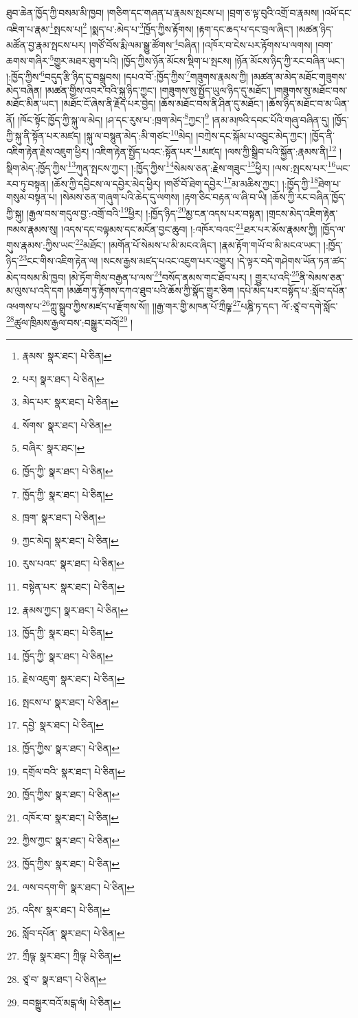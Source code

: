 ཐུབ་ཆེན་ཁྱོད་ཀྱི་བསམ་མི་ཁྱབ། །གཅིག་དང་གཞན་པ་རྣམས་སྤངས་པ། །བྲག་ཅ་ལྟ་བུའི་འགྲོ་བ་རྣམས། །འཕོ་དང་འཇིག་པ་རྣམ་\footnote{རྣམས་  སྣར་ཐང་།  པེ་ཅིན། }སྤངས་པ།\footnote{པར།  སྣར་ཐང་།  པེ་ཅིན། } །སྨད་པ་:མེད་པ་\footnote{མེད་པར་  སྣར་ཐང་།  པེ་ཅིན། }ཁྱོད་ཀྱིས་རྟོགས། །རྟག་དང་ཆད་པ་དང་བྲལ་ཞིང་། །མཚན་ཉིད་མཚོན་བྱ་རྣམ་སྤངས་པར། །གཙོ་བོས་རྨི་ལམ་སྒྱུ་ཚོགས་\footnote{སོགས་  སྣར་ཐང་།  པེ་ཅིན། }བཞིན། །འཁོར་བ་ངེས་པར་རྟོགས་པ་ལགས། །བག་ཆགས་གཞིར་\footnote{བཞིར་  སྣར་ཐང་། }གྱུར་མཐར་ཐུག་པའི། །ཁྱོད་ཀྱིས་ཉོན་མོངས་སྡིག་པ་སྤངས། །ཉོན་མོངས་ཉིད་ཀྱི་རང་བཞིན་ཡང་། །:ཁྱོད་ཀྱིས་\footnote{ཁྱོད་ཀྱི་  སྣར་ཐང་།  པེ་ཅིན། }བདུད་རྩི་ཉིད་དུ་བསྒྲུབས། །དཔའ་བོ་:ཁྱོད་ཀྱིས་\footnote{ཁྱོད་ཀྱི་  སྣར་ཐང་།  པེ་ཅིན། }གཟུགས་རྣམས་ཀྱི། །མཚན་མ་མེད་མཐོང་གཟུགས་མེད་བཞིན། །མཚན་གྱིས་འབར་བའི་སྐུ་ཉིད་ཀྱང་། །གཟུགས་སུ་སྤྱོད་ཡུལ་ཉིད་དུ་མཐོང་། །གཟུགས་སུ་མཐོང་བས་མཐོང་མིན་ཡང་། །མཐོང་ངོ་ཞེས་ནི་རྗོད་པར་བྱེད། །ཆོས་མཐོང་བས་ནི་ཤིན་དུ་མཐོང་། །ཆོས་ཉིད་མཐོང་བ་མ་ཡིན་ནོ། །ཁོང་སྟོང་ཁྱོད་ཀྱི་སྐུ་ལ་མེད། །ཤ་དང་རུས་པ་:ཁྲག་མེད་\footnote{ཁྲག་  སྣར་ཐང་།  པེ་ཅིན། }ཀྱང་།\footnote{ཀྱང་མེད།  སྣར་ཐང་།  པེ་ཅིན། } །ནམ་མཁའི་དབང་པོའི་གཞུ་བཞིན་དུ། །ཁྱོད་ཀྱི་སྐུ་ནི་སྟོན་པར་མཛད། །སྐུ་ལ་བསྙུན་མེད་:མི་གཙང་\footnote{རུས་པའང་  སྣར་ཐང་།  པེ་ཅིན། }མེད། །བཀྲེས་དང་སྐོམ་པ་འབྱུང་མེད་ཀྱང་། །ཁྱོད་ནི་འཇིག་རྟེན་རྗེས་འཇུག་ཕྱིར། །འཇིག་རྟེན་སྤྱོད་པའང་:སྟོན་པར་\footnote{བསྟེན་པར་  སྣར་ཐང་།  པེ་ཅིན། }མཛད། །ལས་ཀྱི་སྒྲིབ་པའི་སྐྱོན་:རྣམས་ནི།\footnote{རྣམས་ཀྱང་།  སྣར་ཐང་།  པེ་ཅིན། } །སྡིག་མེད་:ཁྱོད་ཀྱིས་\footnote{ཁྱོད་ཀྱི་  སྣར་ཐང་།  པེ་ཅིན། }ཀུན་སྤངས་ཀྱང་། །:ཁྱོད་ཀྱིས་\footnote{ཁྱོད་ཀྱི་  སྣར་ཐང་།  པེ་ཅིན། }སེམས་ཅན་:རྗེས་གཟུང་\footnote{རྗེས་འཇུག་  སྣར་ཐང་།  པེ་ཅིན། }ཕྱིར། །ལས་:སྤངས་པར་\footnote{སྤངས་པ་  སྣར་ཐང་།  པེ་ཅིན། }ཡང་རབ་ཏུ་བསྟན། །ཆོས་ཀྱི་དབྱིངས་ལ་དབྱེར་མེད་ཕྱིར། །གཙོ་བོ་ཐེག་དབྱེར་\footnote{དབྱེ་  སྣར་ཐང་།  པེ་ཅིན། }མ་མཆིས་ཀྱང་། །:ཁྱོད་ཀྱི་\footnote{ཁྱོད་ཀྱིས་  སྣར་ཐང་།  པེ་ཅིན། }ཐེག་པ་གསུམ་བསྟན་པ། །སེམས་ཅན་གཞུག་པའི་ཆེད་དུ་ལགས། །རྟག་ཅིང་བརྟན་ལ་ཞི་བ་ཡི། །ཆོས་ཀྱི་རང་བཞིན་ཁྱོད་ཀྱི་སྐུ། །རྒྱལ་བས་གདུལ་བྱ་:འགྲོ་བའི་\footnote{དགྲོལ་བའི་  སྣར་ཐང་།  པེ་ཅིན། }ཕྱིར། །:ཁྱོད་ཉིད་\footnote{ཁྱོད་ཀྱིས་  སྣར་ཐང་།  པེ་ཅིན། }མྱ་ངན་འདས་པར་བསྟན། །གྲངས་མེད་འཇིག་རྟེན་ཁམས་རྣམས་སུ། །འདས་དང་བལྟམས་དང་མངོན་བྱང་ཆུབ། །:འཁོར་བའང་\footnote{འཁོར་བ་  སྣར་ཐང་།  པེ་ཅིན། }ཐར་པར་མོས་རྣམས་ཀྱི། །ཁྱོད་ལ་གུས་རྣམས་:ཀྱིས་ཡང་\footnote{ཀྱིས་ཀྱང་  སྣར་ཐང་།  པེ་ཅིན། }མཐོང་། །མགོན་པོ་སེམས་པ་མི་མངའ་ཞིང་། །རྣམ་རྟོག་གཡོ་བ་མི་མངའ་ཡང་། །:ཁྱོད་ཉིད་\footnote{ཁྱོད་ཀྱིས་  སྣར་ཐང་།  པེ་ཅིན། }ངང་གིས་འཇིག་རྟེན་ལ། །སངས་རྒྱས་མཛད་པའང་འཇུག་པར་འགྱུར། །དེ་ལྟར་བདེ་གཤེགས་ཡོན་ཏན་ཚད་མེད་བསམ་མི་ཁྱབ། །མེ་ཏོག་གིས་བརྒྱན་པ་ལས་\footnote{ལས་བདག་གི་  སྣར་ཐང་།  པེ་ཅིན། }བསོད་ནམས་གང་ཐོབ་པར། །
གྱུར་པ་འདི་\footnote{འདིས་  སྣར་ཐང་།  པེ་ཅིན། }ནི་སེམས་ཅན་མ་ལུས་པ་འདི་དག །མཆོག་ཏུ་རྟོགས་དཀའ་ཐུབ་པའི་ཆོས་ཀྱི་སྣོད་གྱུར་ཅིག །དཔེ་མེད་པར་བསྟོད་པ་:སློབ་དཔོན་འཕགས་པ་\footnote{སློབ་དཔོན་  སྣར་ཐང་།  པེ་ཅིན། }ཀླུ་སྒྲུབ་ཀྱིས་མཛད་པ་རྫོགས་སོ།། །།རྒྱ་གར་གྱི་མཁན་པོ་ཀྲྀཥྞ་\footnote{ཀྲྀཥྚ་  སྣར་ཐང་། ཀྲིཥྚ་  པེ་ཅིན། }པཎྜི་ཏ་དང་། ལོ་:ཙཱ་བ་དགེ་སློང་\footnote{ཙཱ་བ་  སྣར་ཐང་།  པེ་ཅིན། }ཚུལ་ཁྲིམས་རྒྱལ་བས་:བསྒྱུར་བའོ།\footnote{བབསྒྱུར་བའོ་མངྒ་ལཾ།  པེ་ཅིན། } ། 